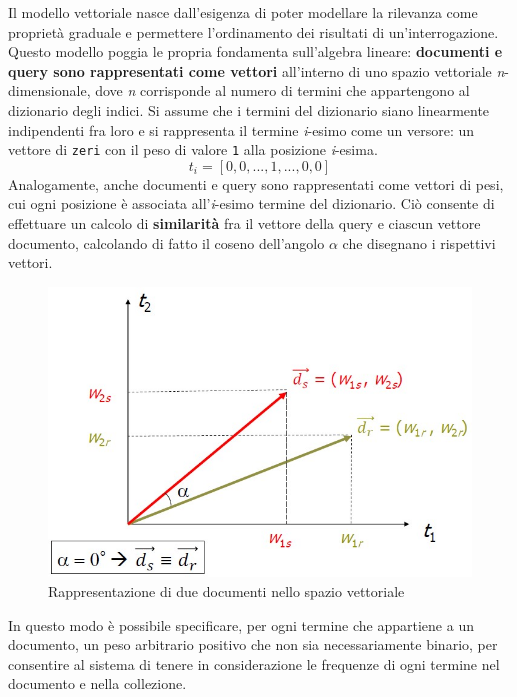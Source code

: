 Il modello vettoriale nasce dall’esigenza di poter modellare la rilevanza come proprietà graduale e permettere l’ordinamento dei risultati di un’interrogazione. Questo modello poggia le propria fondamenta sull’algebra lineare: \textbf{documenti e query sono rappresentati come vettori} all’interno di uno spazio vettoriale \textit{n}-dimensionale, dove \textit{n} corrisponde al numero di termini che appartengono al dizionario degli indici.
Si assume che i termini del dizionario siano linearmente indipendenti fra loro e si rappresenta il termine \textit{i}-esimo come un versore: un vettore di \texttt{zeri} con il peso di valore \texttt{1} alla posizione \textit{i}-esima.
\[ t_{i} = [0, 0, ..., 1, ..., 0, 0] \] %
Analogamente, anche documenti e query sono rappresentati come vettori di pesi, cui ogni posizione è associata all'\textit{i}-esimo termine del dizionario. Ciò consente di effettuare un calcolo di \textbf{similarità} fra il vettore della query e ciascun vettore documento, calcolando di fatto il coseno dell’angolo \(\alpha\) che disegnano i rispettivi vettori.

\begin{figure}[H]
	\centering
	\includegraphics[scale=0.35]{../images/01_5_modello_vettoriale}
	\caption[Rappresentazione di due documenti nello spazio vettoriale]{Rappresentazione di due documenti nello spazio vettoriale}
	\label{fig:vectmodel}
\end{figure}

In questo modo è possibile specificare, per ogni termine che appartiene a un documento, un peso arbitrario positivo che non sia necessariamente binario, per consentire al sistema di tenere in considerazione le frequenze di ogni termine nel documento e nella collezione.

